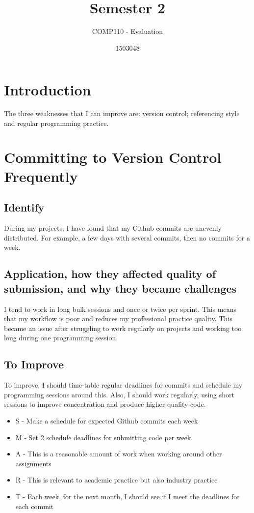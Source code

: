 \documentclass{scrartcl}
\title{Semester 2}
\subtitle{COMP110 - Evaluation}
\author{1503048}
\begin{document}
\maketitle

\section*{Introduction}
The three weaknesses that I can improve are: version control; referencing style and regular programming practice.

\section*{Committing to Version Control Frequently}
\subsection*{Identify}
During my projects, I have found that my Github commits are unevenly distributed. For example, a few days with several commits, then no commits for a week.

\subsection*{Application, how they affected quality of submission, and why they became challenges}
I tend to work in long bulk sessions and once or twice per sprint. This means that my workflow is poor and reduces my professional practice quality. This became an issue after struggling to work regularly on projects and working too long during one programming session.

\subsection*{To Improve}
To improve, I should time-table regular deadlines for commits and schedule my programming sessions around this. Also, I should work regularly, using short sessions to improve concentration and produce higher quality code.

 \begin{itemize}
   \item  S - Make a schedule for expected Github commits each week
	\item M - Set 2 schedule deadlines for submitting code per week
	\item A - This is a reasonable amount of work when working around other assignments
	\item R - This is relevant to academic practice but also industry practice
	\item T - Each week, for the next month, I should see if I meet the deadlines for each commit
 \end{itemize}
\end{document}
